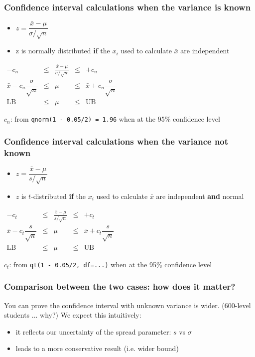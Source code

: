 \begin{frame}\frametitle{Confidence interval calculations when the \textbf{variance is known}}
	\begin{itemize}
		\item	$z = \dfrac{\bar{x} - \mu}{\sigma/\sqrt{n}}$
		\item	z is normally distributed \textbf{if} the $x_i$ used to calculate $\bar{x}$ are independent
	\end{itemize}

	$
	\begin{array}{rcccl}
		- c_n &\leq& \displaystyle \frac{\bar{x} - \mu}{\sigma/\sqrt{n}} &\leq & +c_n\\
		\bar{x} - c_n \dfrac{\sigma}{\sqrt{n}} &\leq& \mu &\leq& \bar{x} + c_n\dfrac{\sigma}{\sqrt{n}} \\
		\text{LB} &\leq& \mu &\leq& \text{UB}
	\end{array}
	$

	$c_n$: from \texttt{qnorm(1 - 0.05/2) = 1.96} when at the 95\% confidence level
\end{frame}

\begin{frame}\frametitle{Confidence interval calculations when the \textbf{variance not known}}
	\begin{itemize}
		\item	$z = \dfrac{\bar{x} - \mu}{s/\sqrt{n}}$
		\item	$z$ is $t$-distributed \textbf{if} the $x_i$ used to calculate $\bar{x}$ are independent \textbf{and} normal
	\end{itemize}

	$
	\begin{array}{rcccl}
		- c_t &\leq& \displaystyle \frac{\bar{x} - \mu}{s/\sqrt{n}} &\leq & +c_t\\
		\bar{x} - c_t \dfrac{s}{\sqrt{n}} &\leq& \mu &\leq& \bar{x} + c_t\dfrac{s}{\sqrt{n}} \\
		\text{LB} &\leq& \mu &\leq& \text{UB}
	\end{array}
	$

	$c_t$: from \texttt{qt(1 - 0.05/2, df=...)} when at the 95\% confidence level
\end{frame}

\begin{frame}\frametitle{Comparison between the two cases: how does it matter?}

	You can prove the confidence interval with unknown variance is wider. (600-level students ... why?)
	\vspace{12pt}
	We expect this intuitively:
	\begin{itemize}
		\item	it reflects our uncertainty of the spread parameter: $s$ vs $\sigma$
		\item	leads to a more conservative result (i.e. wider bound)
	\end{itemize}
\end{frame}

